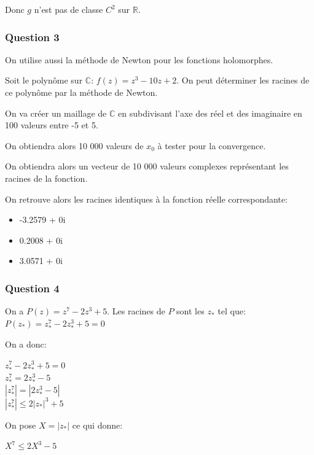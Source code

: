 \documentclass{article}
\begin{document}
	Donc $g$ n'est pas de classe $C^{2}$ sur $\mathbb{R}$.
	
	\subsubsection{Question 3}
	
	On utilise aussi la méthode de Newton pour les fonctions holomorphes.
	
	Soit le polynôme sur $\mathbb{C}$:
	$f(z)=z^{3}-10z+2$. On peut déterminer les racines de ce polynôme par la méthode de Newton.
	
	On va créer un maillage de $\mathbb{C}$ en subdivisant l'axe des réel et des imaginaire en 100 valeurs entre -5 et 5.
	
	On obtiendra alors 10 000 valeurs de $x_{0}$ à tester pour la convergence.
	
	On obtiendra alors un vecteur de 10 000 valeurs complexes représentant les racines de la fonction.
	
	On retrouve alors les racines identiques à la fonction réelle correspondante:
	
	\begin{itemize}
		\item -3.2579 + 0i
		\item 0.2008 + 0i
		\item 3.0571 + 0i
	\end{itemize}

	\subsubsection{Question 4}
	
	On a $P(z)=z^{7}-2z^{3}+5$. Les racines de $P$ sont
	les $z_{*}$ tel que:
	$P(z_{*})=z_{*}^{7}-2z_{*}^{3}+5=0$
	
	On a donc:
	
	\begin{large}
	\begin{center}
		$z_{*}^{7}-2z_{*}^{3}+5=0$\\
		$z_{*}^{7}=2z_{*}^{3}-5$\\
		$|z_{*}^{7}|=|2z_{*}^{3}-5|$\\
		$|z_{*}^{7}| \le 2|z_{*}|^{3}+5$
	\end{center}
	\end{large}	
	
	On pose $X=|z_{*}|$ ce qui donne:
	
	\begin{large}
	\begin{center}
			$X^{7} \le 2X^{3}-5$ 
	\end{center}	
	\end{large}
	
\end{document}
